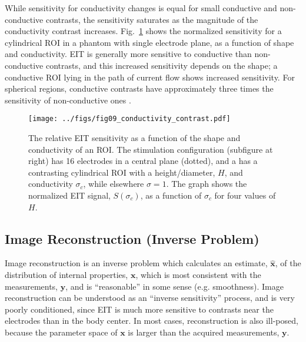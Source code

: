 \documentclass[12pt]{article} \usepackage[margin=3cm]{geometry} \usepackage[margin=20pt,font=small,labelfont=bf]{caption}\def\TBLWIDA{35mm}\def\TBLWIDB{95mm}
\newcommand\Fref[1]{Fig.\ \ref{#1}}
\newcommand{\xB}{\mathbf{x}}
\newcommand{\xH}{\hat{\mathbf{x}}}
\newcommand{\yB}{\mathbf{y}}
\begin{document}
While sensitivity for conductivity changes is equal
for small conductive and non-conductive contrasts, the
sensitivity saturates as the magnitude of the
conductivity contrast increases.
\Fref{fig:perturbation_sensitivity} shows the 
normalized sensitivity for a cylindrical ROI in a
phantom with single electrode plane, as a function of
shape and conductivity.
 EIT is generally more sensitive
to conductive than non-conductive contrasts, and this
increased sensitivity
depends on the shape; a conductive ROI lying in the path
of current flow shows increased sensitivity.
For spherical regions, conductive contrasts have approximately
three times the sensitivity of non-conductive
ones \cite{Adler2015Perturbations}.

\begin{figure} \centering
   \texttt{[image: ../figs/fig09\_conductivity\_contrast.pdf]}
\caption{%
The relative EIT sensitivity as a function of the shape and
conductivity of an ROI. The stimulation configuration (subfigure at right)
has 16 electrodes in a central plane (dotted), and a 
has a contrasting cylindrical ROI with a height/diameter, $H$, and conductivity 
$\sigma_c$, while elsewhere $\sigma=1$.
The graph shows the
normalized EIT signal, $S(\sigma_c)$, as a function of
$\sigma_c$ for four values of $H$.
}
\label{fig:perturbation_sensitivity}
\end{figure}

\subsection{Image Reconstruction (Inverse Problem)}

Image reconstruction is an inverse problem which calculates
an estimate, $\xH$, of 
the distribution of internal properties, $\xB$, which is most consistent
with the measurements, $\yB$, and is ``reasonable'' in some sense (e.g. smoothness). 
Image reconstruction can be understood as an ``inverse sensitivity''
process, and is very poorly conditioned, since EIT is much more
sensitive to contrasts near the electrodes than in the body center.
In most cases, reconstruction is also ill-posed, because the
parameter space of $\xB$ is larger than the acquired measurements, $\yB$.
\end{document}
